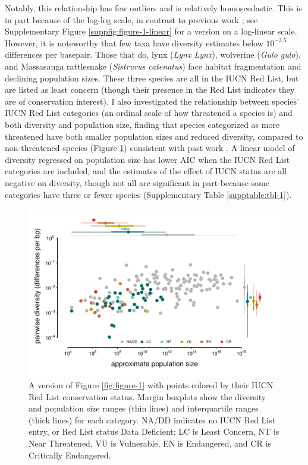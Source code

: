 \documentclass[11pt]{article}
\begin{document}
Notably, this relationship has few outliers and is relatively homoscedastic.
This is in part because of the log-log scale, in contrast to previous work
\parencite{Nei1984-zi,Soule1976-he}; see Supplementary Figure
\ref{suppfig:figure-1-linear} for a version on a log-linear scale. However, it
is noteworthy that few taxa have diversity estimates below $10^{-3.5}$
differences per basepair. Those that do, lynx (\emph{Lynx Lynx}), wolverine
(\emph{Gulo gulo}), and Massasauga rattlesnake (\emph{Sistrurus catenatus})
face habitat fragmentation and declining population sizes. These three species
are all in the IUCN Red List, but are listed as least concern (though their
presence in the Red List indicates they are of conservation interest). I also
investigated the relationship between species' IUCN Red List categories (an
ordinal scale of how threatened a species is) and both diversity and population
size, finding that species categorized as more threatened have both smaller
population sizes and reduced diversity, compared to non-threatened species
(Figure \ref{fig:figure-1-redlist}) consistent with past work
\parencite{Spielman2004-mt}. A linear model of diversity regressed on
population size has lower AIC when the IUCN Red List categories are included,
and the estimates of the effect of IUCN status are all negative on diversity,
though not all are significant in part because some categories have three or
fewer species (Supplementary Table \ref{supptable:tbl-1}).

\begin{figure}[t!]
  \centering
  \includegraphics[width=\textwidth]{figures/diversity_popsize_redlist.pdf}

  \caption{A version of Figure \ref{fig:figure-1} with points colored by their
    IUCN Red List conservation status. Margin boxplots show the diversity and
    population size ranges (thin lines) and interquartile ranges (thick lines)
    for each category. NA/DD indicates no IUCN Red List entry, or Red List
  status Data Deficient; LC is Least Concern, NT is Near Threatened, VU is
Vulnerable, EN is Endangered, and CR is Critically Endangered.}

  \label{fig:figure-1-redlist}
\end{figure}
\end{document}
